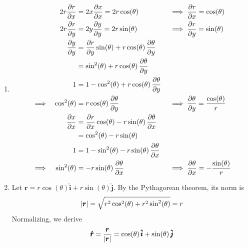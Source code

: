 \documentclass[a4paper]{article}
\begin{document}
\begin{enumerate}[label=(\alph*)]
	\item \begin{alignat}{3}
		&& 2r \frac{\partial r}{\partial x} & = 2x \frac{\partial x}{\partial x} = 2r \cos\!\left(\theta\right) && \implies \frac{\partial r}{\partial x} = \cos\!\left(\theta\right) \\
		&& 2r \frac{\partial r}{\partial y} & = 2y \frac{\partial y}{\partial y} = 2r \sin\!\left(\theta\right) && \implies \frac{\partial r}{\partial y} = \sin\!\left(\theta\right) \\
		&& \frac{\partial y}{\partial y} & = \frac{\partial r}{\partial y}\sin\!\left(\theta\right) + r \cos\!\left(\theta\right) \frac{\partial \theta}{\partial y} && \notag \\
		&&			      & = \sin^{2}\!\left(\theta\right) + r \cos\!\left(\theta\right) \frac{\partial \theta}{\partial y} \notag \\
		&& 1 & = 1 - \cos^{2}\!\left(\theta\right) + r \cos\!\left(\theta\right) \frac{\partial \theta}{\partial y} \notag \\
		\implies && \cos^{2}\!\left(\theta\right) & = r \cos\!\left(\theta\right) \frac{\partial \theta}{\partial y} && \implies \frac{\partial \theta}{\partial y} = \frac{\cos\!\left(\theta\right)}{r} \\
			 && \frac{\partial x}{\partial x} & = \frac{\partial r}{\partial x}\cos\!\left(\theta\right) - r \sin\!\left(\theta\right) \frac{\partial \theta}{\partial x} && \notag \\
			 && 				  & = \cos^{2}\!\left(\theta\right) - r \sin\!\left(\theta\right) && \notag \\
			 && 1 & = 1 - \sin^{2}\!\left(\theta\right) - r \sin\!\left(\theta\right) \frac{\partial \theta}{\partial x} \notag  \\
		\implies && \sin^{2}\!\left(\theta\right) & = -r \sin\!\left(\theta\right) \frac{\partial \theta}{\partial x} && \implies \frac{\partial \theta}{\partial x} = -\frac{\sin\!\left(\theta\right)}{r}
	\end{alignat}
	\item Let \( \pmb{r} = r \cos\!\left(\theta\right) \pmb{\hat{i}} + r \sin\!\left(\theta\right) \pmb{\hat{j}} \). By the Pythagorean theorem, its norm is
	\[
		\abs{\pmb{r}} = \sqrt{r^{2}\cos^{2}\!\left(\theta\right) + r^{2}\sin^{2}\!\left(\theta\right) } = r
	\]
	Normalizing, we derive
	\[
		\pmb{\hat{r}} = \frac{\pmb{r}}{\abs{\pmb{r}}} = \cos\!\left(\theta\right) \pmb{\hat{i}} + \sin\!\left(\theta\right) \pmb{\hat{j}} 
\]
\end{enumerate}
\end{document}
